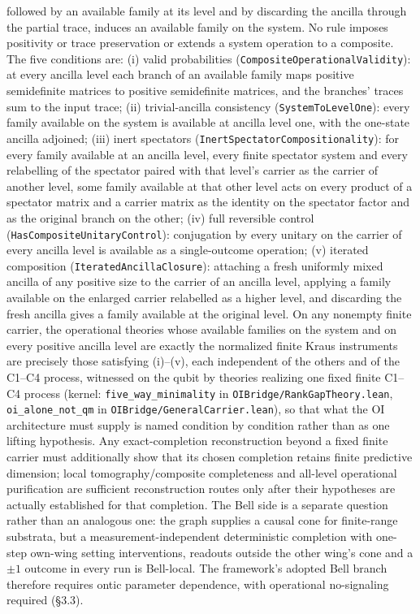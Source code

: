 \documentclass[
]{article}
\begin{document}
followed by an available family at its level and by discarding the
ancilla through the partial trace, induces an available family on the
system. No rule imposes positivity or trace preservation or extends a
system operation to a composite. The five conditions are: (i) valid
probabilities (\texttt{CompositeOperationalValidity}): at every ancilla
level each branch of an available family maps positive semidefinite
matrices to positive semidefinite matrices, and the branches' traces sum
to the input trace; (ii) trivial-ancilla consistency
(\texttt{SystemToLevelOne}): every family available on the system is
available at ancilla level one, with the one-state ancilla adjoined;
(iii) inert spectators (\texttt{InertSpectatorCompositionality}): for
every family available at an ancilla level, every finite spectator
system and every relabelling of the spectator paired with that level's
carrier as the carrier of another level, some family available at that
other level acts on every product of a spectator matrix and a carrier
matrix as the identity on the spectator factor and as the original
branch on the other; (iv) full reversible control
(\texttt{HasCompositeUnitaryControl}): conjugation by every unitary on
the carrier of every ancilla level is available as a single-outcome
operation; (v) iterated composition (\texttt{IteratedAncillaClosure}):
attaching a fresh uniformly mixed ancilla of any positive size to the
carrier of an ancilla level, applying a family available on the enlarged
carrier relabelled as a higher level, and discarding the fresh ancilla
gives a family available at the original level. On any nonempty finite
carrier, the operational theories whose available families on the system
and on every positive ancilla level are exactly the normalized finite
Kraus instruments are precisely those satisfying (i)--(v), each
independent of the others and of the C1--C4 process, witnessed on the
qubit by theories realizing one fixed finite C1--C4 process (kernel:
\texttt{five\_way\_minimality} in \texttt{OIBridge/RankGapTheory.lean},
\texttt{oi\_alone\_not\_qm} in \texttt{OIBridge/GeneralCarrier.lean}),
so that what the OI architecture must supply is named condition by
condition rather than as one lifting hypothesis. Any exact-completion
reconstruction beyond a fixed finite carrier must additionally show that
its chosen completion retains finite predictive dimension; local
tomography/composite completeness and all-level operational purification
are sufficient reconstruction routes only after their hypotheses are
actually established for that completion. The Bell side is a separate
question rather than an analogous one: the graph supplies a causal cone
for finite-range substrata, but a measurement-independent deterministic
completion with one-step own-wing setting interventions, readouts
outside the other wing's cone and a \(\pm1\) outcome in every run is
Bell-local. The framework's adopted Bell branch therefore requires ontic
parameter dependence, with operational no-signaling required (§3.3).
\end{document}
